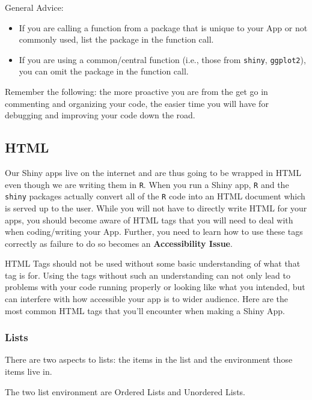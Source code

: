 \documentclass[
]{book}
\providecommand{\tightlist}{%
  \setlength{\itemsep}{0pt}\setlength{\parskip}{0pt}}
\begin{document}
General Advice:

\begin{itemize}
\tightlist
\item
  If you are calling a function from a package that is unique to your App or not commonly used, list the package in the function call.
\item
  If you are using a common/central function (i.e., those from \texttt{shiny}, \texttt{ggplot2}), you can omit the package in the function call.
\end{itemize}

Remember the following: the more proactive you are from the get go in commenting and organizing your code, the easier time you will have for debugging and improving your code down the road.

\hypertarget{html}{%
\subsection{HTML}\label{html}}

Our Shiny apps live on the internet and are thus going to be wrapped in HTML even though we are writing them in \texttt{R}. When you run a Shiny app, \texttt{R} and the \texttt{shiny} packages actually convert all of the \texttt{R} code into an HTML document which is served up to the user. While you will not have to directly write HTML for your apps, you should become aware of HTML tags that you will need to deal with when coding/writing your App. Further, you need to learn how to use these tags correctly as failure to do so becomes an \textbf{Accessibility Issue}.

HTML Tags should not be used without some basic understanding of what that tag is for. Using the tags without such an understanding can not only lead to problems with your code running properly or looking like what you intended, but can interfere with how accessible your app is to wider audience. Here are the most common HTML tags that you'll encounter when making a Shiny App.

\hypertarget{lists}{%
\subsubsection{Lists}\label{lists}}

There are two aspects to lists: the items in the list and the environment those items live in.

The two list environment are Ordered Lists and Unordered Lists.
\end{document}
